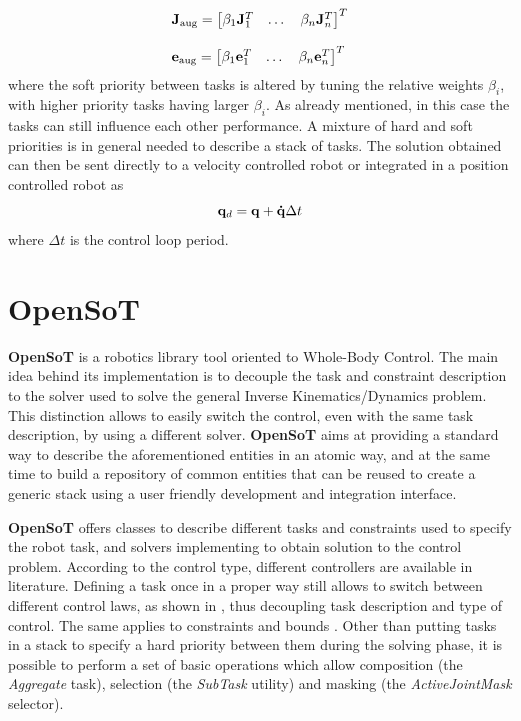\begin{equation}
\label{eq:augmented_jacobian}
\begin{array}{l}
\mathbf{J}_\text{aug}  =  \begin{bmatrix}
\beta_1\mathbf{J}_1^T & \dotsc& \beta_n\mathbf{J}_n^T\end{bmatrix}^T \\ 
\\
\mathbf{e}_\text{aug}  =  \begin{bmatrix}
\beta_1\mathbf{e}_1^T & \dotsc& \beta_n\mathbf{e}_n^T\end{bmatrix}^T 
\end{array}
\end{equation}
where the soft priority between tasks is altered by tuning the relative weights $\beta_i$, with higher priority tasks having larger $\beta_i$. As already mentioned, in this case the tasks can still influence each other performance.
 A mixture of hard and soft priorities is in general needed to describe a stack of tasks.
 The solution obtained can then be sent directly to a velocity controlled robot or integrated in a position controlled robot as
\begin{equation}
    \mathbf{q}_d = \mathbf{q} + \mathbf{\dot{q}} \Delta t 
\end{equation}
where $\Delta t$ is the control loop period.

\section{OpenSoT} \label{open_sot}
\textbf{OpenSoT} is a robotics library tool oriented to Whole-Body Control. The main idea behind its implementation is to decouple the task and constraint description to the solver used to solve the general Inverse Kinematics/Dynamics problem. This distinction allows to easily switch the control, even with the same task description, by using a different solver. \textbf{OpenSoT} aims at providing a standard way to describe the aforementioned entities in an atomic way, and at the same time to build a repository of common entities that can be reused to create a generic stack using a user friendly development and integration interface.

\textbf{OpenSoT} offers classes %
to describe different tasks and constraints used to specify the robot task, and solvers implementing to obtain solution to the control problem. According to the control type, different controllers are available in literature. Defining a task once in a proper way still allows to switch between different control laws, as shown in \cite{Nakanishi08operationalspace}, thus decoupling task description and type of control. 
The same applies to constraints and bounds \cite{DBLP:conf/icra/FlaccoLK12}. 
Other than putting tasks in a stack to specify a hard priority between them during the solving phase, it is possible to perform a set of basic operations which allow composition (the \emph{Aggregate} task), selection (the \emph{SubTask} utility) and masking (the \emph{ActiveJointMask} selector).

